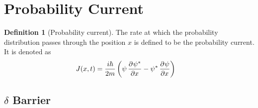 \documentclass[titlepage, fleqn, a4paper, 12pt, twoside]{article}
\theoremstyle{definition}
\newtheorem{definition}{Definition}
\theoremstyle{theorem}
\let\Oldsection\section
\renewcommand{\section}{\FloatBarrier\Oldsection}
\let\Oldsubsection\subsection
\renewcommand{\subsection}{\FloatBarrier\Oldsubsection}
\begin{document}
\section{Probability Current}

\begin{definition}[Probability current]
	The rate at which the probability distribution passes through the position $x$ is defined to be the probability current.
	It is denoted as
	\begin{align*}
		J(x,t) &= \frac{i \hbar}{2 m} \left( \psi \dpd{\psi^*}{x} - \psi^* \dpd{\psi}{x} \right)
	\end{align*}
\end{definition}

\subsection{$\delta$ Barrier}
\end{document}
